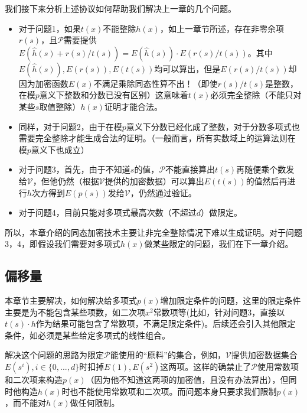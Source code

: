 \documentclass[12pt]{article}
\newcommand{\pp}{$\mathcal{P}$}
\newcommand{\vv}{$\mathcal{V}$}
\begin{document}
我们接下来分析上述协议如何帮助我们解决上一章的几个问题。
\begin{itemize}
\item 对于问题1，如果$t(x)$不能整除$h(x)$，如上一章节所述，存在非零余项$r(s)$，且\pp 需要提供$E(\hat{h}(s)+r(s)/t(s))=E(\hat{h}(s))\cdot E(r(s)/t(s))$。其中$E(\hat{h}(s)),E(r(s)),E(t(s))$均可以算出，但是$E(r(s)/t(s))$却因为加密函数$E(x)$不满足乘除同态性算不出！（即使$r(s)/t(s)$是整数，在模$p$意义下整数和分数已没有区别）这意味着$t(x)$必须完全整除（不能只对某些$s$取值整除）$h(x)$证明才能合法。
\item 同样，对于问题2，由于在模$p$意义下分数已经化成了整数，对于分数多项式也需要完全整除才能生成合法的证明。（一般而言，所有实数域上的运算法则在模$p$意义下也成立）
\item 对于问题3，首先，由于不知道$s$的值，\pp 不能直接算出$t(s)$再随便乘个数发给\vv，但他仍然（根据\vv 提供的加密数据）可以算出$E(t(s))$的值然后再进行$h$次方得到$E(p(s))$发给\vv，仍然通过验证。
\item 对于问题4，目前只能对多项式最高次数（不超过$d$）做限定。
\end{itemize}
所以，本章介绍的同态加密技术主要让非完全整除情况下难以生成证明。对于问题3，4，即假设我们需要对多项式$h(x)$做某些限定的问题，我们在下一章介绍。
\subsection{偏移量}
\label{sec:shift}
本章节主要解决，如何解决给多项式$p(x)$增加限定条件的问题，这里的限定条件主要是为不能包含某些项数，如二次项$x^2$常数项等(比如，针对问题3，直接以$t(s)\cdot h$作为结果可能包含了常数项，不满足限定条件)。后续还会引入其他限定条件，如必须是某些给定多项式的线性组合。

解决这个问题的思路为限定\pp 能使用的“原料”的集合，例如，\vv 提供加密数据集合$E(s^i),i\in \{0,...,d\}$时扣掉$E(1),E(s^2)$这两项。这样的确禁止了\pp 使用常数项和二次项来构造$p(x)$（因为他不知道这两项的加密值，且没有办法算出），但同时他构造$h(x)$时也不能使用常数项和二次项。而问题本身只要求我们限制$p(x)$，而不能对$h(x)$做任何限制。
\end{document}
